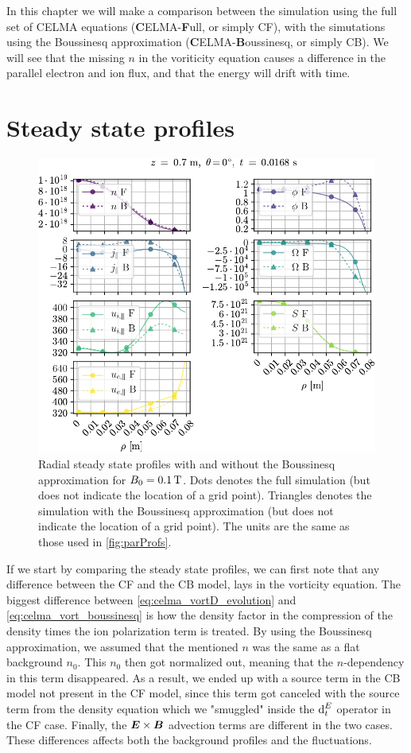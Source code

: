 In this chapter we will make a comparison between the simulation using the full set of CELMA equations (\textbf{C}ELMA-\textbf{F}ull, or simply CF), with the simutations using the Boussinesq approximation (\textbf{C}ELMA-\textbf{B}oussinesq, or simply CB).
We will see that the missing $n$ in the voriticity equation causes a difference in the parallel electron and ion flux, and that the energy will drift with time.

\section{Steady state profiles}
%
\begin{figure}[h]
    \centering
    \includegraphics{fig/results/compareBouss/1DProfRad001B}
    \caption{Radial steady state profiles with and without the Boussinesq approximation for $B_0=0.1\, \text{T}$.
        Dots denotes the full simulation (but does not indicate the location of a grid point).
        Triangles denotes the simulation with the Boussinesq approximation (but does not indicate the location of a grid point).
        The units are the same as those used in \cref{fig:parProfs}.
    }
    \label{fig:compareBoussProfRad}
\end{figure}
%
If we start by comparing the steady state profiles, we can first note that any difference between the CF and the CB model, lays in the vorticity equation.
The biggest difference between \cref{eq:celma_vortD_evolution} and \cref{eq:celma_vort_boussinesq} is how the density factor in the compression of the density times the ion polarization term is treated.
By using the Boussinesq approximation, we assumed that the mentioned $n$ was the same as a flat background $n_0$.
This $n_0$ then got normalized out, meaning that the $n$-dependency in this term disappeared.
As a result, we ended up with a source term in the CB model not present in the CF model, since this term got canceled with the source term from the density equation which we "smuggled" inside the $\text{d}_t^E$ operator in the CF case.
Finally, the $\boldsymbol{E}\times\boldsymbol{B}$ advection terms are different in the two cases.
These differences affects both the background profiles and the fluctuations.

